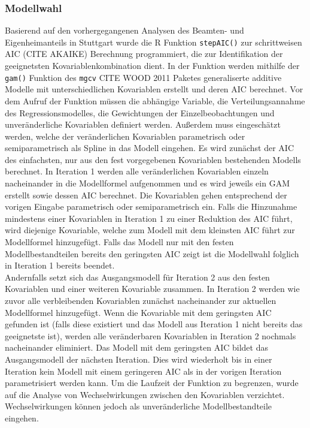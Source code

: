 \documentclass{Vorlage}
\begin{document}
\subsubsection{Modellwahl}
Basierend auf den vorhergegangenen Analysen des Beamten- und Eigenheimanteils in Stuttgart wurde die R Funktion \texttt{stepAIC()} zur schrittweisen AIC (CITE AKAIKE) Berechnung programmiert, die zur Identifikation der geeignetsten Kovariablenkombination dient. In der Funktion werden mithilfe der \texttt{gam()} Funktion des \texttt{mgcv} CITE WOOD 2011 Paketes generaliserte additive Modelle mit unterschiedlichen Kovariablen erstellt und deren AIC berechnet. Vor dem Aufruf der Funktion müssen die abhängige Variable, die Verteilungsannahme des Regressionsmodelles, die Gewichtungen der Einzelbeobachtungen und unveränderliche Kovariablen definiert werden. Außerdem muss eingeschätzt werden, welche der veränderlichen Kovariablen parametrisch oder semiparametrisch als Spline in das Modell eingehen. Es wird zunächst der AIC des einfachsten, nur aus den fest vorgegebenen Kovariablen bestehenden Modells berechnet. In Iteration 1 werden alle veränderlichen Kovariablen einzeln nacheinander in die Modellformel aufgenommen und es wird jeweils ein GAM erstellt sowie dessen AIC berechnet. Die Kovariablen gehen entsprechend der vorigen Eingabe parametrisch oder semiparametrisch ein. Falls die Hinzunahme mindestens einer Kovariablen in Iteration 1 zu einer Reduktion des AIC führt, wird diejenige Kovariable, welche zum Modell mit dem kleinsten AIC führt zur Modellformel hinzugefügt. Falls das Modell nur mit den festen Modellbestandteilen bereits den geringsten AIC zeigt ist die Modellwahl folglich in Iteration 1 bereits beendet.\\ Andernfalls setzt sich das Ausgangsmodell für Iteration 2 aus den festen Kovariablen und einer weiteren Kovariable zusammen. In Iteration 2 werden wie zuvor alle verbleibenden Kovariablen zunächst nacheinander zur aktuellen Modellformel hinzugefügt. Wenn die Kovariable mit dem geringsten AIC gefunden ist (falls diese existiert und das Modell aus Iteration 1 nicht bereits das geeignetste ist), werden alle veränderbaren Kovariablen in Iteration 2 nochmals nacheinander eliminiert. Das Modell mit dem geringsten AIC bildet das Ausgangsmodell der nächsten Iteration. Dies wird wiederholt bis in einer Iteration kein Modell mit einem geringeren AIC als in der vorigen Iteration parametrisiert werden kann. Um die Laufzeit der Funktion zu begrenzen, wurde auf die Analyse von Wechselwirkungen zwischen den Kovariablen verzichtet. Wechselwirkungen können jedoch als unveränderliche Modellbestandteile eingehen.
\end{document}
